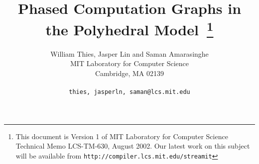 \documentclass[10pt]{article}
\title{Phased Computation Graphs in the Polyhedral Model~\footnote{\small This document is Version 1 of MIT Laboratory for Computer Science Technical Memo LCS-TM-630, August 2002.  Our latest work on this subject will be available from \texttt{http://compiler.lcs.mit.edu/streamit}} \hfill}
\author{William Thies, Jasper Lin and Saman Amarasinghe \\
  MIT Laboratory for Computer Science\\
  Cambridge, MA  02139\\ \\
  \texttt{\symbol{`\{}thies, jasperln, saman\symbol{`\}}@lcs.mit.edu}}
\date{}
\begin{document}
  \maketitle

  \newcommand{\mt}[1]{\mbox{\it #1}}
  \newcommand{\todo}[1]{\framebox{\bf #1}}
  \newcommand{\dep}[0]{Dependence Frontier}                %
  \newcommand{\DP}[0]{\textsc{Frontier}}                   %
  \newcommand{\DEP}[2]{\DP_{#1 \small{\rightarrow} #2}}    %
  \newcommand{\sssection}[1]{\medskip \noindent {\bf #1} \smallskip}

  \begin{abstract}
    
  \end{abstract}

  
  
  
  
  
  
  

\vspace{-18pt}
  \begin{small}
    \begin{singlespace}
      
      
    \end{singlespace}
  \end{small}
  
  \newpage
  
  
\end{document}
